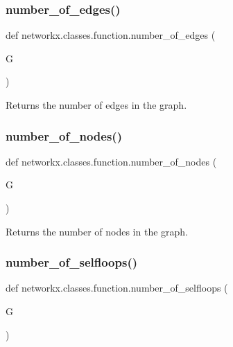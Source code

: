 \subsubsection{\texorpdfstring{number\+\_\+of\+\_\+edges()}{number\_of\_edges()}}
{\footnotesize\ttfamily def networkx.\+classes.\+function.\+number\+\_\+of\+\_\+edges (\begin{DoxyParamCaption}\item[{}]{G }\end{DoxyParamCaption})}

\begin{DoxyVerb}Returns the number of edges in the graph.\end{DoxyVerb}
 \mbox{\label{namespacenetworkx_1_1classes_1_1function_af683224caf58051461a40ab33821115e}} 
\subsubsection{\texorpdfstring{number\+\_\+of\+\_\+nodes()}{number\_of\_nodes()}}
{\footnotesize\ttfamily def networkx.\+classes.\+function.\+number\+\_\+of\+\_\+nodes (\begin{DoxyParamCaption}\item[{}]{G }\end{DoxyParamCaption})}

\begin{DoxyVerb}Returns the number of nodes in the graph.\end{DoxyVerb}
 \mbox{\label{namespacenetworkx_1_1classes_1_1function_aa89beffb331b0ed1c2a60df70f3d4f62}} 
\subsubsection{\texorpdfstring{number\+\_\+of\+\_\+selfloops()}{number\_of\_selfloops()}}
{\footnotesize\ttfamily def networkx.\+classes.\+function.\+number\+\_\+of\+\_\+selfloops (\begin{DoxyParamCaption}\item[{}]{G }\end{DoxyParamCaption})}

